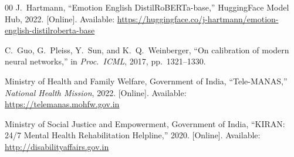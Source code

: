 \documentclass[10pt, conference, letterpaper]{IEEEtran}
\begin{document}
\begin{thebibliography}{00}
J.~Hartmann,
``Emotion English DistilRoBERTa-base,''
HuggingFace Model Hub, 2022.
[Online]. Available:
\url{https://huggingface.co/j-hartmann/emotion-english-distilroberta-base}

C.~Guo, G.~Pleiss, Y.~Sun, and K.~Q.~Weinberger,
``On calibration of modern neural networks,''
in \textit{Proc.\ ICML}, 2017, pp.~1321--1330.

Ministry of Health and Family Welfare, Government of India,
``Tele-MANAS,''
\textit{National Health Mission}, 2022.
[Online]. Available: \url{https://telemanas.mohfw.gov.in}

Ministry of Social Justice and Empowerment, Government of India,
``KIRAN: 24/7 Mental Health Rehabilitation Helpline,''
2020.
[Online]. Available: \url{http://disabilityaffairs.gov.in}

\end{thebibliography}
\end{document}
